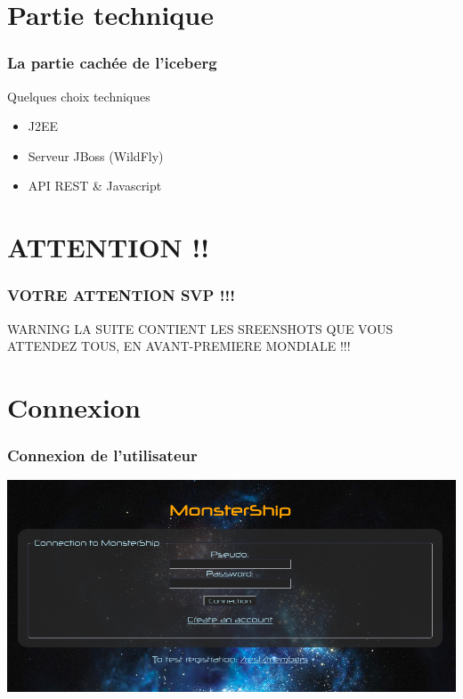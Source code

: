 \documentclass{beamer}
\begin{document}
	\section{Partie technique}
		\begin{frame}
			\frametitle{La partie cachée de l'iceberg}
			\begin{block}{Quelques choix techniques}
				\begin{itemize}
					\item J2EE
					\item Serveur JBoss (WildFly)
					\item API REST \& Javascript
				\end{itemize}
			\end{block}
		\end{frame}
	
	\section{ATTENTION !!}
		\begin{frame}
			\frametitle{VOTRE ATTENTION SVP !!!}
			\begin{alertblock}{WARNING}
				LA SUITE CONTIENT LES SREENSHOTS QUE VOUS ATTENDEZ TOUS, EN AVANT-PREMIERE MONDIALE !!!
			\end{alertblock}
		\end{frame}
		
	\section{Connexion}
		\begin{frame}
		\frametitle{Connexion de l'utilisateur}
			\includegraphics[width=1\textwidth]{images/connexion.png} 
		\end{frame}
		
\end{document}
